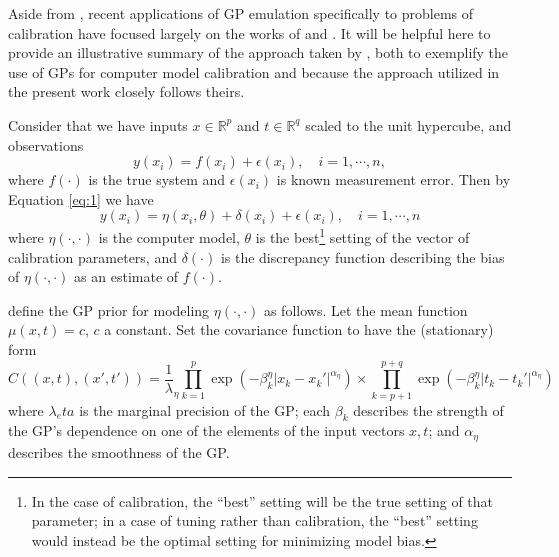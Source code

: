 \documentclass{article}
\begin{document}

Aside from \cite{Kennedy2001}, recent applications of GP emulation specifically to problems of calibration have focused largely on the works of \cite{Williams2006} and \cite{Bayarri2007}. It will be helpful here to provide an illustrative summary of the approach taken by \cite{Williams2006}, both to exemplify the use of GPs for computer model calibration and because the approach utilized in the present work closely follows theirs.

Consider that we have inputs $x\in \mathbb R^p$ and $t\in\mathbb R^q$ scaled to the unit hypercube, and observations 
\begin{equation}\label{eq:2}
y(x_i) = f(x_i) + \epsilon(x_i),\quad i=1,\cdots,n,
\end{equation}
where $f(\cdot)$ is the true system and $\epsilon(x_i)$ is known measurement error. Then by Equation \ref{eq:1} we have
\begin{equation}\label{eq:2}
y(x_i) = \eta(x_i,\theta) + \delta(x_i) + \epsilon(x_i),\quad i=1,\cdots,n
\end{equation}
where $\eta(\cdot,\cdot)$ is the computer model, $\theta$ is the best\footnote{In the case of calibration, the ``best'' setting will be the true setting of that parameter; in a case of tuning rather than calibration, the ``best'' setting would instead be the optimal setting for minimizing model bias.}
setting of the vector of calibration parameters, and $\delta(\cdot)$ is the discrepancy function describing the bias of $\eta(\cdot,\cdot)$ as an estimate of $f(\cdot)$.

\citeauthor*{Williams2006} define the GP prior for modeling $\eta(\cdot,\cdot)$ as follows. Let the mean function $\mu(x,t)=c$, $c$ a constant. Set the covariance function to have the (stationary) form 
\begin{equation}\label{eq:Hig_cov}
C((x,t),(x',t')) = \frac 1\lambda_\eta \prod_{k=1}^{p}
\exp \left(-\beta^\eta_k|x_k-x_k'|^{\alpha_\eta}\right) \times
\prod_{k=p+1}^{p+q}
\exp \left(-\beta^\eta_{k}|t_k-t_k'|^{\alpha_\eta}\right)
\end{equation}
where $\lambda_eta$ is the marginal precision of the GP; each $\beta_k$ describes the strength of the GP's dependence on one of the elements of the input vectors $x,t$; and $\alpha_\eta$ describes the smoothness of the GP. 
\end{document}
